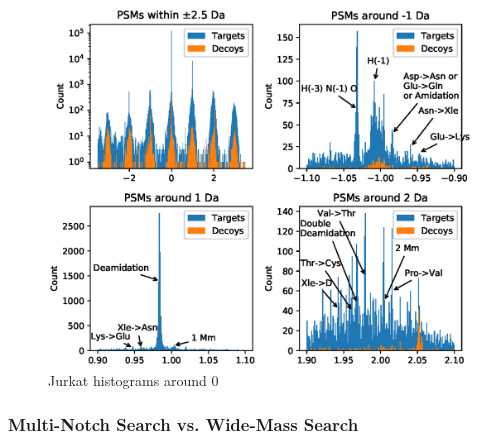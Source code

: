 \documentclass[journal=jprobs,manuscript=article]{achemso}
\begin{document}
\begin{figure}
\caption{Jurkat histograms around 0}
\label{fig:fig3jurkat-1012}
\includegraphics{fig3jurkat-1012}
\end{figure}

\subsubsection{Multi-Notch Search vs. Wide-Mass Search}
\end{document}
